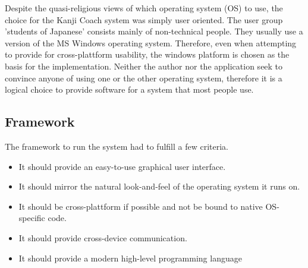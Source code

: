 Despite the quasi-religious views of which operating system (OS) to use, 
the choice for the Kanji Coach system was simply user oriented. 
The user group 'students of Japanese' consists mainly of non-technical people. 
They usually use a version of the MS Windows operating system. Therefore, even 
when attempting to provide for cross-plattform usability, 
the windows platform is chosen as the basis for the implementation. 
Neither the author nor the application seek to convince anyone of using one 
or the other operating system, therefore it is a logical choice to provide 
software for a system that most people use.

\subsection{Framework}
\label{sec:framework}

The framework to run the system had to fulfill a few criteria.
\begin{itemize}

  \item It should provide an easy-to-use graphical user interface.

  \item It should mirror the natural look-and-feel of the operating system 
        it runs on.

  \item It should be cross-plattform if possible and not be bound to native
        OS-specific code.

  \item It should provide cross-device communication.

  \item It should provide a modern high-level programming language

\end{itemize}

